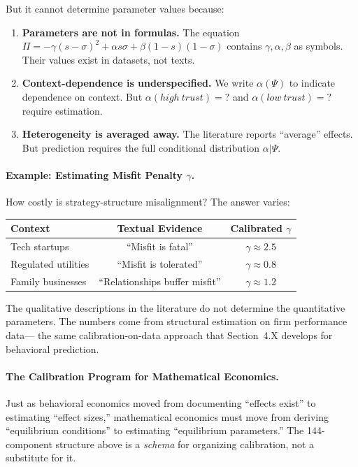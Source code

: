 But it cannot determine parameter values because:
\begin{enumerate}
    \item \textbf{Parameters are not in formulas.} The equation $\Pi = -\gamma(s-\sigma)^2 + \alpha s\sigma + \beta(1-s)(1-\sigma)$ contains $\gamma, \alpha, \beta$ as symbols. Their values exist in datasets, not texts.
    
    \item \textbf{Context-dependence is underspecified.} We write $\alpha(\Psi)$ to indicate dependence on context. But $\alpha(high\ trust) = ?$ and $\alpha(low\ trust) = ?$ require estimation.
    
    \item \textbf{Heterogeneity is averaged away.} The literature reports ``average'' effects. But prediction requires the full conditional distribution $\alpha | \Psi$.
\end{enumerate}

\paragraph{Example: Estimating Misfit Penalty $\gamma$.}
How costly is strategy-structure misalignment? The answer varies:
\begin{center}
\small
\begin{tabular}{lcc}
\toprule
\textbf{Context} & \textbf{Textual Evidence} & \textbf{Calibrated $\gamma$} \\
\midrule
Tech startups & ``Misfit is fatal'' & $\gamma \approx 2.5$ \\
Regulated utilities & ``Misfit is tolerated'' & $\gamma \approx 0.8$ \\
Family businesses & ``Relationships buffer misfit'' & $\gamma \approx 1.2$ \\
\bottomrule
\end{tabular}
\end{center}

The qualitative descriptions in the literature do not determine the quantitative parameters.
The numbers come from structural estimation on firm performance data---
the same calibration-on-data approach that Section~4.X develops for behavioral prediction.

\paragraph{The Calibration Program for Mathematical Economics.}
Just as behavioral economics moved from documenting ``effects exist'' to estimating
``effect sizes,'' mathematical economics must move from deriving ``equilibrium conditions''
to estimating ``equilibrium parameters.'' The 144-component structure above
is a \emph{schema} for organizing calibration, not a substitute for it.

